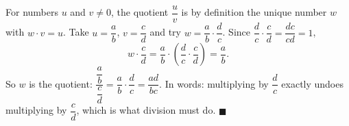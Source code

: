 For numbers $u$ and $v\ne0$, the quotient $\dfrac uv$ is by definition the unique number $w$ with $w\cdot v=u$. Take $u=\dfrac ab$, $v=\dfrac cd$ and try $w=\dfrac ab\cdot\dfrac dc$. Since $\dfrac dc\cdot\dfrac cd=\dfrac{dc}{cd}=1$,
\[w\cdot\dfrac cd=\dfrac ab\cdot\left(\dfrac dc\cdot\dfrac cd\right)=\dfrac ab.\]
So $w$ is the quotient: $\dfrac{\dfrac ab}{\dfrac cd}=\dfrac ab\cdot\dfrac dc=\dfrac{ad}{bc}$. In words: multiplying by $\dfrac dc$ exactly undoes multiplying by $\dfrac cd$, which is what division must do. $\blacksquare$
